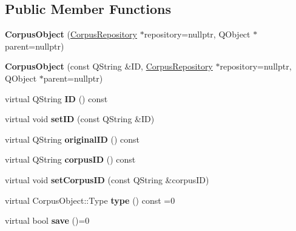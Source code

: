 \subsection*{Public Member Functions}
\begin{DoxyCompactItemize}
\item 
\mbox{\label{class_corpus_object_a566aa38d732176789207ea0d7fbab2bc}} 
{\bfseries Corpus\+Object} (\hyperlink{class_corpus_repository}{Corpus\+Repository} $\ast$repository=nullptr, Q\+Object $\ast$parent=nullptr)
\item 
\mbox{\label{class_corpus_object_a8e00309147ddefacf88b2d09e8727ec1}} 
{\bfseries Corpus\+Object} (const Q\+String \&ID, \hyperlink{class_corpus_repository}{Corpus\+Repository} $\ast$repository=nullptr, Q\+Object $\ast$parent=nullptr)
\item 
\mbox{\label{class_corpus_object_a458418cb64b8605e7c2f7b7cdffa09ab}} 
virtual Q\+String {\bfseries ID} () const
\item 
\mbox{\label{class_corpus_object_a05c01cd12ca002adda56391be2f13456}} 
virtual void {\bfseries set\+ID} (const Q\+String \&ID)
\item 
\mbox{\label{class_corpus_object_a7b738ad4e8eafe37d48b4e0b98f884f2}} 
virtual Q\+String {\bfseries original\+ID} () const
\item 
\mbox{\label{class_corpus_object_a37a6a4a4316fd90b3492cd483b0afc78}} 
virtual Q\+String {\bfseries corpus\+ID} () const
\item 
\mbox{\label{class_corpus_object_a8fc4da05cc682e58dd808fb74f1dd6df}} 
virtual void {\bfseries set\+Corpus\+ID} (const Q\+String \&corpus\+ID)
\item 
\mbox{\label{class_corpus_object_a852a551d621797fa865826355b9949e8}} 
virtual Corpus\+Object\+::\+Type {\bfseries type} () const =0
\item 
\mbox{\label{class_corpus_object_aa703c47d513173a42d449a8896bc972d}} 
virtual bool {\bfseries save} ()=0
\item 

\end{DoxyCompactItemize}
